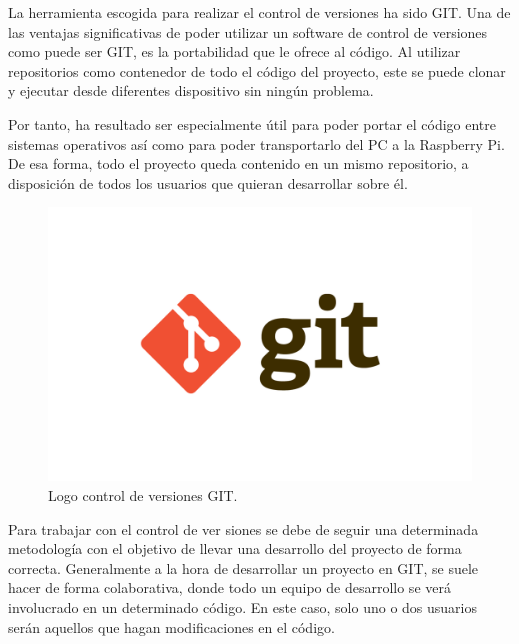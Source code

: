 La herramienta escogida para realizar el control de versiones ha sido GIT. Una de las ventajas significativas de poder utilizar un software de control de versiones como puede ser GIT, es la portabilidad que le ofrece al código. Al utilizar repositorios como contenedor de todo el código del proyecto, este se puede clonar y ejecutar desde diferentes dispositivo sin ningún problema.

Por tanto, ha resultado ser especialmente útil para poder portar el código entre sistemas operativos así como para poder transportarlo del PC a la Raspberry Pi. De esa forma, todo el proyecto queda contenido en un mismo repositorio, a disposición de todos los usuarios que quieran desarrollar sobre él.

\begin{figure}[h]
    \centering
    \includegraphics[scale=0.2]{fig/git.png}
    \caption{Logo control de versiones GIT.}
    \label{fig:mesh1}
\end{figure}

Para trabajar con el control de ver siones se debe de seguir una determinada metodología con el objetivo de llevar una desarrollo del proyecto de forma correcta. Generalmente a la hora de desarrollar un proyecto en GIT, se suele hacer de forma colaborativa, donde todo un equipo de desarrollo se verá involucrado en un determinado código. En este caso, solo uno o dos usuarios serán aquellos que hagan modificaciones en el código.

